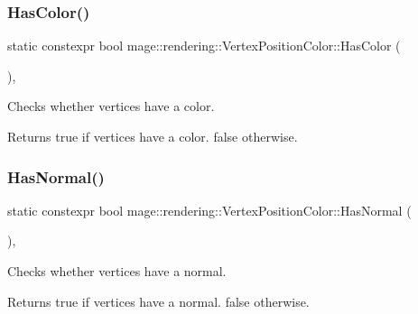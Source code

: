 \subsubsection{\texorpdfstring{Has\+Color()}{HasColor()}}
{\footnotesize\ttfamily static constexpr bool mage\+::rendering\+::\+Vertex\+Position\+Color\+::\+Has\+Color (\begin{DoxyParamCaption}{ }\end{DoxyParamCaption})\hspace{0.3cm}{\ttfamily [static]}, {\ttfamily [noexcept]}}

Checks whether vertices have a color.

\begin{DoxyReturn}{Returns}
{\ttfamily true} if vertices have a color. {\ttfamily false} otherwise. 
\end{DoxyReturn}
\mbox{\label{structmage_1_1rendering_1_1_vertex_position_color_a95f2749a6f879b4123034a78c504f3c5}} 
\subsubsection{\texorpdfstring{Has\+Normal()}{HasNormal()}}
{\footnotesize\ttfamily static constexpr bool mage\+::rendering\+::\+Vertex\+Position\+Color\+::\+Has\+Normal (\begin{DoxyParamCaption}{ }\end{DoxyParamCaption})\hspace{0.3cm}{\ttfamily [static]}, {\ttfamily [noexcept]}}

Checks whether vertices have a normal.

\begin{DoxyReturn}{Returns}
{\ttfamily true} if vertices have a normal. {\ttfamily false} otherwise. 
\end{DoxyReturn}
\mbox{\label{structmage_1_1rendering_1_1_vertex_position_color_a9a905a75c75030b37575a7b65dff61b0}} 
